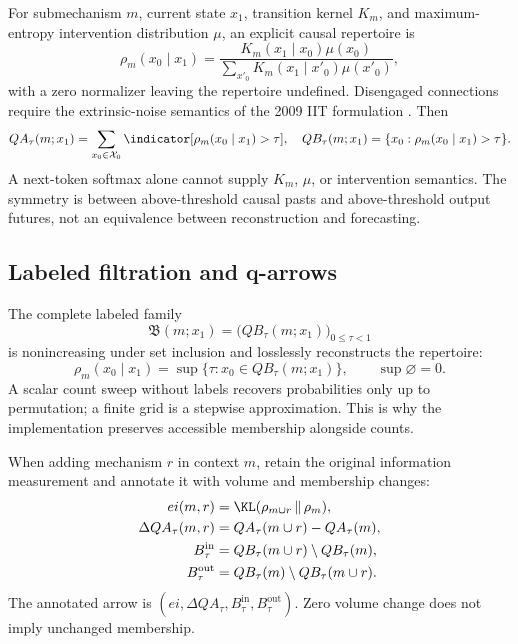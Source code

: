 For submechanism $m$, current state $x_1$, transition kernel $K_m$, and maximum-entropy intervention distribution $\mu$, an explicit causal repertoire is
\begin{equation}
\rho_m(x_0\mid x_1)=
\frac{K_m(x_1\mid x_0)\mu(x_0)}
{\sum_{x'_0}K_m(x_1\mid x'_0)\mu(x'_0)},
\label{eq:causal-repertoire}
\end{equation}
with a zero normalizer leaving the repertoire undefined. Disengaged connections require the extrinsic-noise semantics of the 2009 IIT formulation \cite{iit2009}. Then
\begin{equation}
QA_\tau(m;x_1)=\sum_{x_0\in\mathcal X_0}\indicator[\rho_m(x_0\mid x_1)>\tau],
\quad QB_\tau(m;x_1)=\{x_0:\rho_m(x_0\mid x_1)>\tau\}.
\end{equation}
A next-token softmax alone cannot supply $K_m$, $\mu$, or intervention semantics. The symmetry is between above-threshold causal pasts and above-threshold output futures, not an equivalence between reconstruction and forecasting.

\subsection{Labeled filtration and q-arrows}
The complete labeled family
\begin{equation}
\mathfrak B(m;x_1)=\bigl(QB_\tau(m;x_1)\bigr)_{0\leq\tau<1}
\end{equation}
is nonincreasing under set inclusion and losslessly reconstructs the repertoire:
\begin{equation}
\rho_m(x_0\mid x_1)=
\sup\{\tau:x_0\in QB_\tau(m;x_1)\},\qquad \sup\varnothing=0.
\label{eq:filtration-reconstruction}
\end{equation}
A scalar count sweep without labels recovers probabilities only up to permutation; a finite grid is a stepwise approximation. This is why the implementation preserves accessible membership alongside counts.

When adding mechanism $r$ in context $m$, retain the original information measurement and annotate it with volume and membership changes:
\begin{align}
ei(m,r)&=\KL(\rho_{m\cup r}\,\|\,\rho_m),\\
\Delta QA_\tau(m,r)&=QA_\tau(m\cup r)-QA_\tau(m),\\
B^{\mathrm{in}}_\tau&=QB_\tau(m\cup r)\setminus QB_\tau(m),\\
B^{\mathrm{out}}_\tau&=QB_\tau(m)\setminus QB_\tau(m\cup r).
\end{align}
The annotated arrow is $(ei,\Delta QA_\tau,B^{\mathrm{in}}_\tau,B^{\mathrm{out}}_\tau)$. Zero volume change does not imply unchanged membership.

